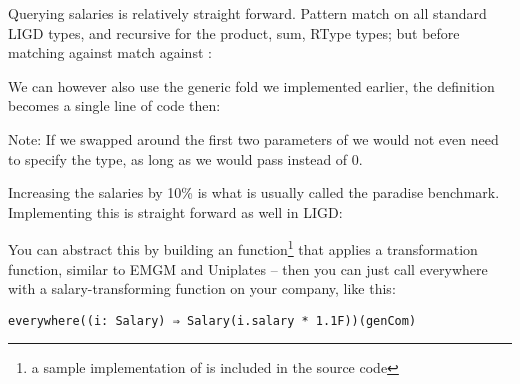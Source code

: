 

\begin{example}

Querying salaries is relatively straight forward. Pattern match on all standard
LIGD types, and recursive for the product, sum, RType types; but before matching
against  match against :



We can however also use the generic fold we implemented earlier, the definition
becomes a single line of code then:



Note: If we swapped around the first two parameters of  we would not even
need to specify the  type, as long as we would pass  instead
of 0.

\end{example}

\begin{example}

Increasing the salaries by 10\% is what is usually called the paradise
benchmark. Implementing this is straight forward as well in LIGD:



You can abstract this by building an  function\footnote{a sample implementation of  is included in the source code} that applies
a transformation function, similar to EMGM and Uniplates  -- then
you can just call everywhere with a salary-transforming function on your company,
like this:
\begin{lstlisting}[caption=Increase the salaries using \cd{everywhere}]
  everywhere((i: Salary) ⇒ Salary(i.salary * 1.1F))(genCom)
\end{lstlisting}

\end{example}

